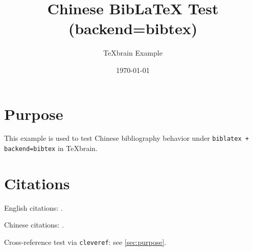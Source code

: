 \documentclass[12pt,a4paper,fontset=fandol]{ctexart}
\title{\textbf{Chinese BibLaTeX Test}\\\large (backend=bibtex)}
\author{TeXbrain Example}
\date{\today}
\let\cref\autoref
\begin{document}
\maketitle

\section{Purpose}\label{sec:purpose}
This example is used to test Chinese bibliography behavior under
\texttt{biblatex + backend=bibtex} in TeXbrain.

\section{Citations}\label{sec:citations}
English citations: \cite{knuth1984texbook,vaswani2017attention}.

Chinese citations: \cite{zhouzhihua2016ml,liguojie2012bigdata}.

Cross-reference test via \texttt{cleveref}: see \cref{sec:purpose}.

\printbibliography
\end{document}
